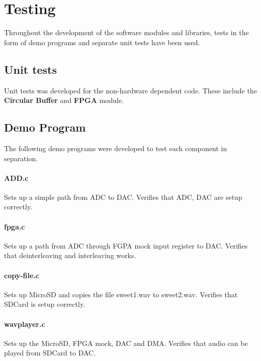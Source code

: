 \section{Testing}

Throughout the development of the software modules and libraries, tests in the form
of demo programs and separate unit tests have been used. 

\subsection{Unit tests}

Unit tests was developed for the non-hardware dependent code. These include the 
{\bf Circular Buffer} and {\bf FPGA} module. 

\subsection{Demo Program}
The following demo programs were developed to test each component in separation.


\paragraph{ADD.c} 
Sets up a simple path from ADC to DAC. 
Verifies that ADC, DAC are setup correctly.

\paragraph{fpga.c} 
Sets up a path from ADC through FGPA mock input register to DAC.
Verifies that deinterleaving and interleaving works.

\paragraph{copy-file.c}
Sets up MicroSD and copies the file sweet1.wav to sweet2.wav.
Verifies that SDCard is setup correctly.

\paragraph{wavplayer.c}
Sets up the MicroSD, FPGA mock, DAC and DMA. 
Verifies that audio can be played from SDCard to DAC.

